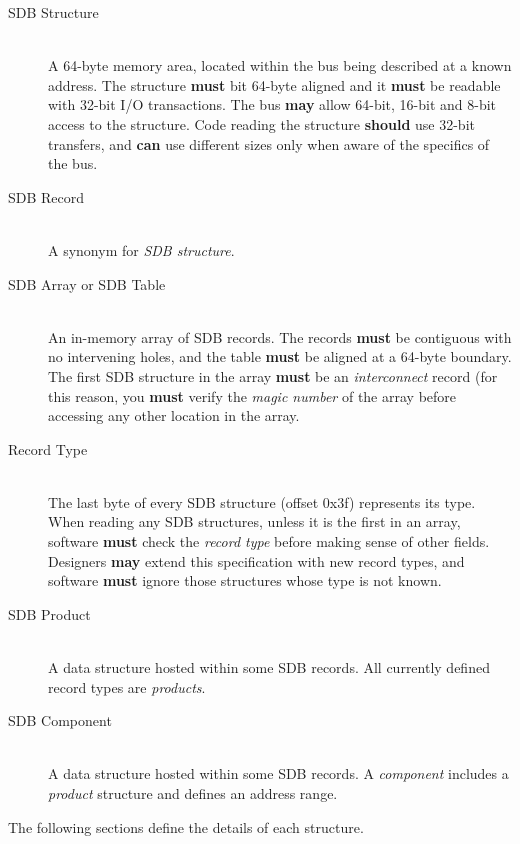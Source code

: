 \documentclass[a4paper, 12pt]{article}
\begin{document}
\begin{description}
\item[SDB Structure] \hfill \\
A 64-byte memory area, located within the bus being described
at a known address. The structure \textbf{must} bit 64-byte aligned
and it \textbf{must} be readable with
32-bit I/O transactions. The bus \textbf{may} allow 64-bit, 16-bit
and 8-bit access to the structure.  Code reading the structure
\textbf{should} use 32-bit transfers, and \textbf{can} use different
sizes only when aware of the specifics of the bus.

\item[SDB Record] \hfill \\
A synonym for \textit{SDB structure}.

\item[SDB Array or SDB Table] \hfill \\
An in-memory array of SDB records. The records \textbf{must}
be contiguous with no intervening holes, and the table \textbf{must}
be aligned at a 64-byte boundary.
The first SDB structure in the array \textbf{must} be an \textit{interconnect}
record (for this reason, you \textbf{must} verify the \textit{magic number}
of the array before accessing any other location in the array.

\item[Record Type] \hfill \\
The last byte of every SDB structure (offset 0x3f) represents its type.
When reading any SDB structures, unless it is the first in an array,
software \textbf{must} check the \textit{record type} before making sense
of other fields.  Designers \textbf{may} extend this specification with
new record types, and software \textbf{must} ignore those structures
whose type is not known.

\item[SDB Product] \hfill \\
A data structure hosted within some SDB records. All currently defined
record types are \textit{products}.

\item[SDB Component] \hfill \\
A data structure hosted within some SDB records. A \textit{component}
includes a \textit{product} structure and defines an address range.

\end{description}

The following sections define the details of each structure.
\end{document}
